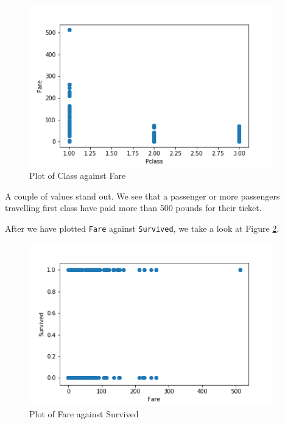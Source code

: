 \documentclass[11pt]{article}
\begin{document}
\begin{figure}[htbp]
\centering
\includegraphics[width=400px]{./PclassFare.png}
\caption{\label{tab:classfare}
Plot of Class against Fare}
\end{figure}

A couple of values stand out. We see that a passenger or more passengers travelling first class have paid more than 500 pounds for their ticket.

After we have plotted  \texttt{Fare} against \texttt{Survived}, we take a look at Figure \ref{tab:faresurvived}. 
\begin{figure}[htbp]
\centering
\includegraphics[width=400px]{./FareSurvived.png}
\caption{\label{tab:faresurvived}
Plot of Fare against Survived}
\end{figure}
\end{document}
